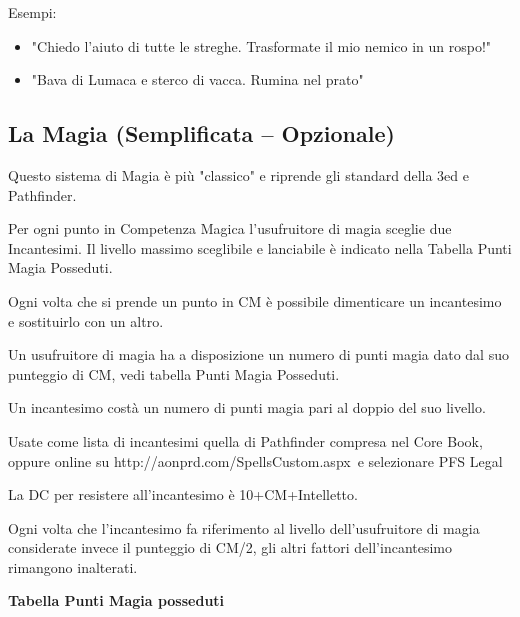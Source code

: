 \documentclass[a4paper,11pt,twoside,openany]{book}
\begin{document}
\bigskip


Esempi:
\begin{itemize}
	\item
	 "Chiedo l'aiuto di tutte le streghe. Trasformate il mio nemico in un rospo!"
	\item
	 "Bava di Lumaca e sterco di vacca. Rumina nel prato"
\end{itemize}

\pagebreak



\pagebreak

\subsection{La Magia (Semplificata -- Opzionale)}


Questo sistema di Magia è più "classico" e riprende gli standard della 3ed e Pathfinder.

Per ogni punto in Competenza Magica l'usufruitore di magia sceglie due Incantesimi. Il livello massimo sceglibile e lanciabile è indicato nella Tabella Punti Magia Posseduti.

Ogni volta che si prende un punto in CM è possibile dimenticare un incantesimo e sostituirlo con un altro.

Un usufruitore di magia ha a disposizione un numero di punti magia dato dal suo punteggio di CM, vedi tabella Punti Magia Posseduti.

Un incantesimo costà un numero di punti magia pari al doppio del suo livello.

Usate come lista di incantesimi quella di Pathfinder compresa nel Core Book, oppure online su http://aonprd.com/SpellsCustom.aspx\ e selezionare PFS Legal

La DC per resistere all'incantesimo è 10+CM+Intelletto.

Ogni volta che l'incantesimo fa riferimento al livello dell'usufruitore di magia considerate invece il punteggio di CM/2, gli altri fattori dell'incantesimo rimangono inalterati.

\bigskip

\textbf{Tabella Punti Magia posseduti}

\bigskip
\end{document}
